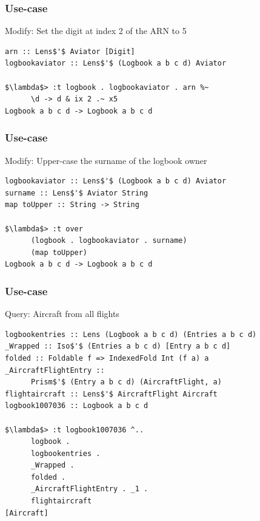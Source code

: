 \begin{frame}[fragile]
\frametitle{Use-case}
\begin{block}{Modify: Set the digit at index 2 of the ARN to 5}
\begin{lstlisting}[style=haskell,basicstyle=\scriptsize\ttfamily,mathescape]
arn :: Lens$'$ Aviator [Digit]
logbookaviator :: Lens$'$ (Logbook a b c d) Aviator

$\lambda$> :t logbook . logbookaviator . arn %~
      \d -> d & ix 2 .~ x5
Logbook a b c d -> Logbook a b c d
\end{lstlisting}
\end{block}
\end{frame}

\begin{frame}[fragile]
\frametitle{Use-case}
\begin{block}{Modify: Upper-case the surname of the logbook owner}
\begin{lstlisting}[style=haskell,basicstyle=\scriptsize\ttfamily,mathescape]
logbookaviator :: Lens$'$ (Logbook a b c d) Aviator
surname :: Lens$'$ Aviator String
map toUpper :: String -> String

$\lambda$> :t over
      (logbook . logbookaviator . surname)
      (map toUpper)
Logbook a b c d -> Logbook a b c d
\end{lstlisting}
\end{block}
\end{frame}

\begin{frame}[fragile]
\frametitle{Use-case}
\begin{block}{Query: Aircraft from all flights}
\begin{lstlisting}[style=haskell,basicstyle=\scriptsize\ttfamily,mathescape]
logbookentries :: Lens (Logbook a b c d) (Entries a b c d)
_Wrapped :: Iso$'$ (Entries a b c d) [Entry a b c d]
folded :: Foldable f => IndexedFold Int (f a) a 
_AircraftFlightEntry ::
      Prism$'$ (Entry a b c d) (AircraftFlight, a)
flightaircraft :: Lens$'$ AircraftFlight Aircraft
logbook1007036 :: Logbook a b c d

$\lambda$> :t logbook1007036 ^..
      logbook .
      logbookentries .
      _Wrapped .
      folded .
      _AircraftFlightEntry . _1 .
      flightaircraft
[Aircraft]
\end{lstlisting}
\end{block}
\end{frame}

